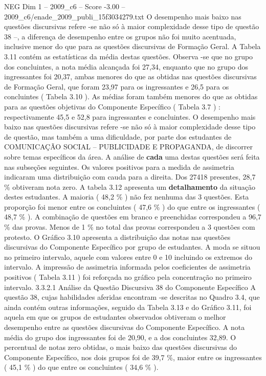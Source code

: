 \begin{textsample}{NEG Dim 1 – 2009\_c6 – Score -3.00 – 2009\_c6/enade\_2009\_publi\_15f3034279.txt}
O desempenho mais baixo nas questões discursivas refere -se não só à maior complexidade desse tipo de questão 38 –, a diferença de desempenho entre os grupos não foi muito acentuada, inclusive menor do que para as questões discursivas de Formação Geral.
A Tabela 3.11 contém as estatísticas da média destas questões.
Observa -se que no grupo dos concluintes, a nota média alcançada foi 27,34, enquanto que no grupo dos ingressantes foi 20,37, ambas menores do que as obtidas nas questões discursivas de Formação Geral, que foram 23,97 para os ingressantes e 26,5 para os concluintes ( Tabela 3.10 ).
As médias foram também menores do que as obtidas para as questões objetivas do Componente Específico ( Tabela 3.7 ) : respectivamente 45,5 e 52,8 para ingressantes e concluintes.
O desempenho mais baixo nas questões discursivas refere -se não só à maior complexidade desse tipo de questão, mas também a uma dificuldade, por parte dos estudantes de COMUNICAÇÃO SOCIAL – PUBLICIDADE E PROPAGANDA, de discorrer sobre temas específicos da área.
A análise de \textbf{cada} uma destas questões será feita nas subseções seguintes.
Os valores positivos para a medida de assimetria indicaram uma distribuição com cauda para a direita.
Dos 27418 presentes, 28,7 \% obtiveram nota zero.
A tabela 3.12 apresenta um \textbf{detalhamento} da situação destes estudantes.
A maioria ( 48,2 \% ) não fez nenhuma das 3 questões.
Esta proporção foi menor entre os concluintes ( 47,6 \% ) do que entre os ingressantes ( 48,7 \% ).
A combinação de questões em branco e preenchidas correspondeu a 96,7 \% das provas.
Menos de 1 \% no total das provas correspondeu a 3 questões com protesto.
O Gráfico 3.10 apresenta a distribuição das notas nas questões discursivas do Componente Específico por grupo de estudantes.
A moda se situou no primeiro intervalo, aquele com valores entre 0 e 10 incluindo os extremos do intervalo.
A impressão de assimetria informada pelos coeficientes de assimetria positivos ( Tabela 3.11 ) foi reforçada no gráfico pela concentração no primeiro intervalo. 3.3.2.1 Análise da Questão Discursiva 38 do Componente Específico A questão 38, cujas habilidades aferidas encontram -se descritas no Quadro 3.4, que ainda contém outras informações, seguido da Tabela 3.13 e do Gráfico 3.11, foi aquela em que os grupos de estudantes observados obtiveram o melhor desempenho entre as questões discursivas do Componente Específico.
A nota média do grupo dos ingressantes foi de 20,90, e a dos concluintes 32,89.
O percentual de notas zero obtidas, o mais baixo das questões discursivas do Componente Específico, nos dois grupos foi de 39,7 \%, maior entre os ingressantes ( 45,1 \% ) do que entre os concluintes ( 34,6 \% ).

\end{textsample}
